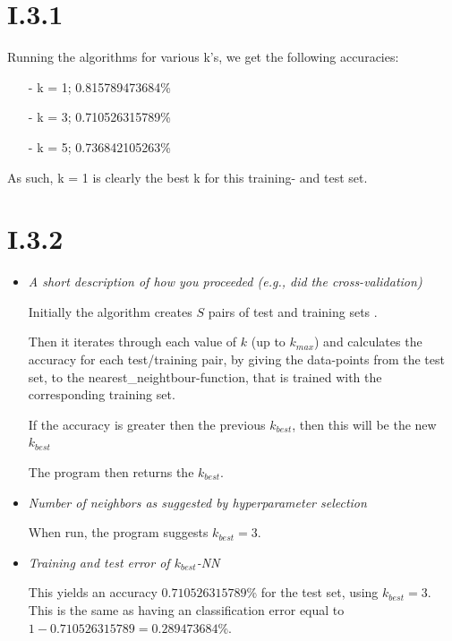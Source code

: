 \documentclass[12pt, a4paper]{article}
\begin{document}
\section{I.3.1}

Running the algorithms for various k's, we get the following accuracies:

\begin{itemize}
\item[-] k = 1; 0.815789473684\%
\item[-] k = 3; 0.710526315789\% 
\item[-] k = 5; 0.736842105263\%
\end{itemize}

As such, k = 1 is clearly the best k for this training- and test set.

\section{I.3.2}
\begin{itemize}
\item \textit{A short description of how you proceeded (e.g., did the
cross-validation)}

Initially the algorithm creates $S$ pairs of test and training sets .

Then it iterates through each value of $k$ (up to $k_{max}$) and calculates the accuracy for each test/training pair, by giving the data-points from the test set, to the nearest\_neightbour-function, that is trained with the corresponding training set.

If the accuracy is greater then the previous $k_{best}$, then this will be the new $k_{best}$

The program then returns the $k_{best}$.

\item \textit{Number of neighbors as suggested by hyperparameter selection}

When run, the program suggests $k_{best} = 3$.

\item \textit{Training and test error of $k_{best}$-NN}

This yields an accuracy $0.710526315789$\% for the test set, using $k_{best} = 3$. This is the same as having an classification error equal to $1 - 0.710526315789 = 0.289473684$\%. 

\end{itemize}
\end{document}
